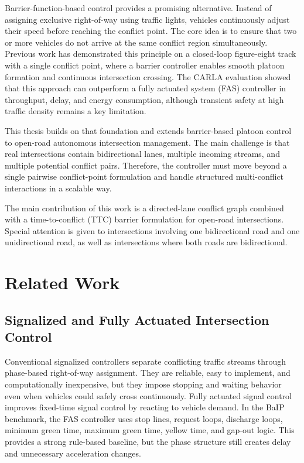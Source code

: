 \documentclass[conference]{IEEEtran}
\begin{document}
Barrier-function-based control provides a promising alternative. Instead of assigning exclusive right-of-way using traffic lights, vehicles continuously adjust their speed before reaching the conflict point. The core idea is to ensure that two or more vehicles do not arrive at the same conflict region simultaneously. Previous work has demonstrated this principle on a closed-loop figure-eight track with a single conflict point, where a barrier controller enables smooth platoon formation and continuous intersection crossing. The CARLA evaluation showed that this approach can outperform a fully actuated system (FAS) controller in throughput, delay, and energy consumption, although transient safety at high traffic density remains a key limitation.

This thesis builds on that foundation and extends barrier-based platoon control to open-road autonomous intersection management. The main challenge is that real intersections contain bidirectional lanes, multiple incoming streams, and multiple potential conflict pairs. Therefore, the controller must move beyond a single pairwise conflict-point formulation and handle structured multi-conflict interactions in a scalable way.

The main contribution of this work is a directed-lane conflict graph combined with a time-to-conflict (TTC) barrier formulation for open-road intersections. Special attention is given to intersections involving one bidirectional road and one unidirectional road, as well as intersections where both roads are bidirectional.

\section{Related Work}

\subsection{Signalized and Fully Actuated Intersection Control}
Conventional signalized controllers separate conflicting traffic streams through phase-based right-of-way assignment. They are reliable, easy to implement, and computationally inexpensive, but they impose stopping and waiting behavior even when vehicles could safely cross continuously. Fully actuated signal control improves fixed-time signal control by reacting to vehicle demand. In the BaIP benchmark, the FAS controller uses stop lines, request loops, discharge loops, minimum green time, maximum green time, yellow time, and gap-out logic. This provides a strong rule-based baseline, but the phase structure still creates delay and unnecessary acceleration changes.
\end{document}
